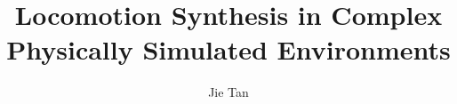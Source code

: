 \documentclass{gatech-thesis}
\title{Locomotion Synthesis in Complex Physically Simulated Environments}
\author{Jie Tan}
\begin{document}

%
\begin{preliminary}
\begin{acknowledgements}

\end{acknowledgements}
%
\contents
%
\begin{summary}

\end{summary}
\end{preliminary}
%







\appendix

\begin{postliminary}
\end{postliminary}
\end{document}
